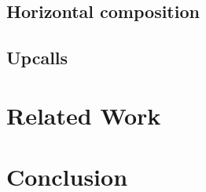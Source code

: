 \documentclass[acmsmall,screen,review,anonymous]{acmart}
\begin{document}



\subsection{Horizontal composition}

\subsection{Upcalls}

\section{Related Work}

\section{Conclusion}


\end{document}
